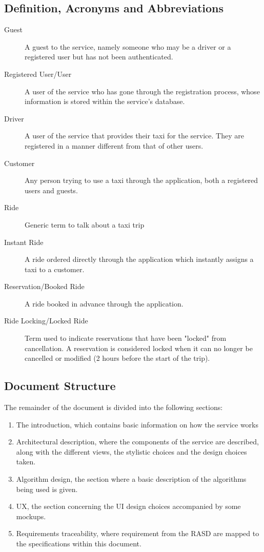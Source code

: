 \subsection{Definition, Acronyms and Abbreviations}
\begin{description}
	\item[Guest]
		A guest to the service, namely someone who may be a driver or a registered user but has not been authenticated.
	\item[Registered User/User]
		A user of the service who has gone through the registration process, whose information is stored within the service's database.
	\item[Driver]
		A user of the service that provides their taxi for the service. They are registered in a manner different from that of other users.
	\item[Customer]
		Any person trying to use a taxi through the application, both a registered users and guests.
	\item[Ride]
		Generic term to talk about a taxi trip
	\item[Instant Ride]
		A ride ordered directly through the application which instantly assigns a taxi to a customer.
	\item[Reservation/Booked Ride]
		A ride booked in advance through the application.
	\item[Ride Locking/Locked Ride]
		Term used to indicate reservations that have been "locked" from cancellation. A reservation is considered locked when it can no
		longer be cancelled or modified (2 hours before the start of the trip).
\end{description}

\subsection{Document Structure}
	The remainder of the document is divided into the following sections:
	\begin{enumerate}
	\item The introduction, which contains basic information on how the service works
	\item Architectural description, where the components of the service are described, along with the different views, the stylistic choices and the design choices taken.
	\item Algorithm design, the section where a basic description of the algorithms being used is given.
	\item UX, the section concerning the UI design choices accompanied by some mockups.
	\item Requirements traceability, where requirement from the RASD are mapped to the specifications within this document.
	\end{enumerate}

